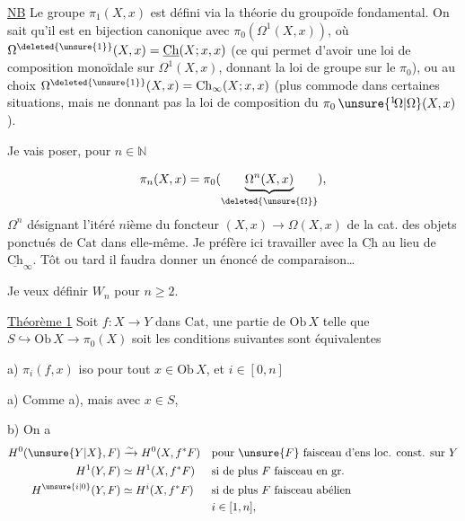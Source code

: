 \uline{NB} Le groupe $\pi_1(X,x)$ est défini via la théorie du groupoïde fondamental. On sait qu'il est en bijection canonique avec $\pi_0(\Omega^1(X,x))$, où $\Omega^{\deleted{\unsure{1}}}(X,x)=\underline{\mathrm{Ch}}(X;x,x)$ (ce qui permet d'avoir une loi de composition monoïdale sur $\Omega^1(X,x)$, donnant la loi de groupe sur le $\pi_0$), ou au choix $\Omega^{\deleted{\unsure{1}}}(X,x)=\mathrm{Ch}_{\infty}(X;x,x)$ (plus commode dans certaines situations, mais ne donnant pas  la loi de composition du $\pi_0\,\unsure{{}^{1}\!\Omega|\Omega}(X,x)$).

Je vais poser, pour $n\in\mathbb N$

\[
\pi_n(X,x)=\pi_0(\underbrace{\Omega^n(X,x)}_{\deleted{\unsure{\Omega}}}), 
\]
$\Omega^n$ désignant l'itéré $n$ième du foncteur $(X,x)\longrightarrow\Omega(X,x)$ de la cat.  des  objets ponctués de $\mathrm{Cat}$ dans elle-même. Je préfère  ici travailler avec la  $\underline{\mathrm{Ch}}$ au lieu de $\underline{\mathrm{Ch}}_\infty$. Tôt ou tard il faudra donner un énoncé de comparaison\ldots

Je veux définir $W_n$ pour $n\geq 2$.

\uline{Théorème\inserted{\unsure{$\checkmark$}} 1} Soit $f:X\to Y$ dans $\mathrm{Cat}$,    une partie de $\mathrm{Ob}\,X$ telle que  $S\hookrightarrow\mathrm{Ob}\,X\longrightarrow\pi_0(X)$ soit  les conditions suivantes sont équivalentes



a)  $\pi_i(f,x)$ iso pour tout $x\in\mathrm{Ob}\,X$, et  $i\in[0,n]$


a) Comme a), mais avec $x\in S$,


b) On a
\[
\begin{aligned}
 H^0(\unsure{Y|X},F)&\xrightarrow{\sim} H^0(X,f^*F) &&\text{pour $\unsure{F}$ faisceau d'ens loc. const. sur $Y$}\\
 H^1(Y,F)&\simeq H^1(X,f^*F) &&\text{si de plus $F$ faisceau en gr.}\\
 H^{\unsure{i|0}}(Y,F)&\simeq H^i(X,f^*F) &&\text{si de plus $F$ faisceau abélien}\\
 &&&i\in[1,n],
\end{aligned}
\]
